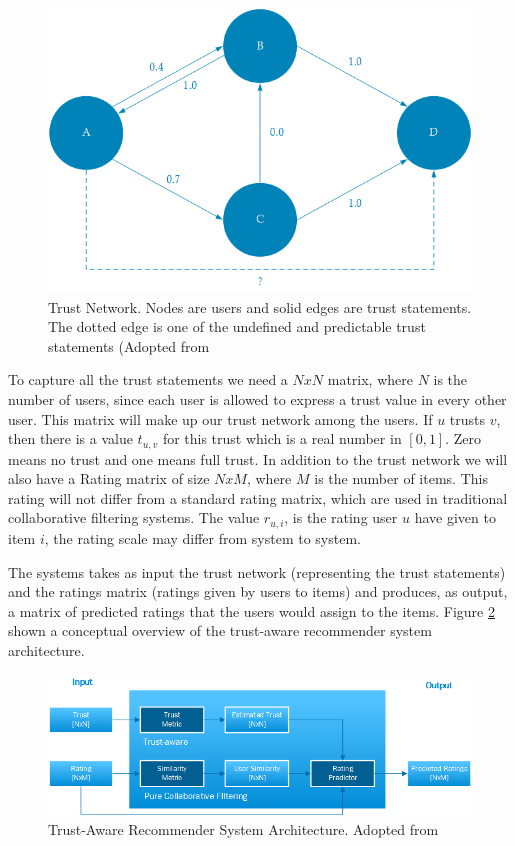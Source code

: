 \begin{figure}[H]
    \includegraphics[width=5in]{image/webofTrust.png}
    \centering
    \caption[Trust Network]{Trust Network. Nodes are users and solid edges are trust statements. The dotted edge is one of the undefined and predictable trust statements (Adopted from \cite{Massa2004}}
    \label{figure:weboftrust}
\end{figure}

To capture all the trust statements we need a $NxN$ matrix, where $N$ is the number of users, since each user is allowed to express a trust value in every other user. This matrix will make up our trust network among the users. If $u$ trusts $v$, then there is a value $t_{u,v}$ for this trust which is a real number in $[0,1]$. Zero means no trust and one means full trust. In addition to the trust network we will also have a Rating matrix of size $NxM$, where $M$ is the number of items. This rating will not differ from a standard rating matrix, which are used in traditional collaborative filtering systems. The value $r_{u, i}$, is the rating user $u$ have given to item $i$, the rating scale may differ from system to system.

The systems takes as input the trust network (representing the trust statements) and the ratings matrix (ratings given by users to items) and produces, as output, a matrix of predicted ratings that the users would assign to the items. Figure \ref{figure:trustarchictecture} shown a conceptual overview of the trust-aware recommender system architecture.

\begin{figure}[H]
    \includegraphics[width=5in]{image/trustawarearchitecture.png}
    \centering
    \caption[Trust-Aware Recommender System Architecture]{Trust-Aware Recommender System Architecture. Adopted from \cite{Massa2004}}
    \label{figure:trustarchictecture}
\end{figure}

